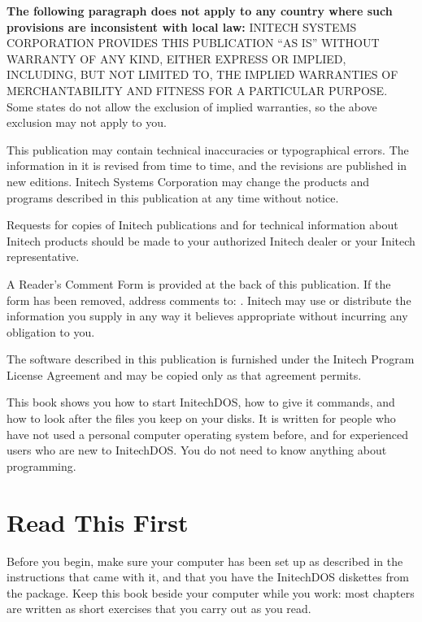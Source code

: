 \begin{TitleVerso}
{\imLegalFont
\textbf{The following paragraph does not apply to any country where such
provisions are inconsistent with local law:} INITECH SYSTEMS CORPORATION
PROVIDES THIS PUBLICATION ``AS IS'' WITHOUT WARRANTY OF ANY KIND, EITHER
EXPRESS OR IMPLIED, INCLUDING, BUT NOT LIMITED TO, THE IMPLIED WARRANTIES OF
MERCHANTABILITY AND FITNESS FOR A PARTICULAR PURPOSE.  Some states do not
allow the exclusion of implied warranties, so the above exclusion may not
apply to you.\par
This publication may contain technical inaccuracies or typographical errors.
The information in it is revised from time to time, and the revisions are
published in new editions.  Initech Systems Corporation may change the
products and programs described in this publication at any time without
notice.\par
Requests for copies of Initech publications and for technical information
about Initech products should be made to your authorized Initech dealer or
your Initech representative.\par}

{\footnotesize
A Reader's Comment Form is provided at the back of this publication.  If the
form has been removed, address comments to: \InitechAddressLine.
Initech may use or distribute the information you supply in any way it
believes appropriate without incurring any obligation to you.\par
The software described in this publication is furnished under the Initech
Program License Agreement and may be copied only as that agreement
permits.\par}
\end{TitleVerso}

This book shows you how to start InitechDOS, how to give it commands, and
how to look after the files you keep on your disks.  It is written for
people who have not used a personal computer operating system before, and
for experienced users who are new to InitechDOS.  You do not need to know
anything about programming.

\section{Read This First}
Before you begin, make sure your computer has been set up as described in
the instructions that came with it, and that you have the InitechDOS
diskettes from the package.  Keep this book beside your computer while you
work: most chapters are written as short exercises that you carry out as you
read.

